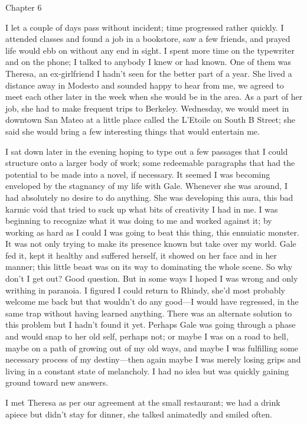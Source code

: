 Chapter 6

I let a couple of days pass without incident; time progressed rather
quickly. I attended classes and found a job in a bookstore, saw a few
friends, and prayed life would ebb on without any end in sight. I spent
more time on the typewriter and on the phone; I talked to anybody I knew
or had known. One of them was Theresa, an ex-girlfriend I hadn't seen
for the better part of a year. She lived a distance away in Modesto and
sounded happy to hear from me, we agreed to meet each other later in the
week when she would be in the area. As a part of her job, she had to
make frequent trips to Berkeley. Wednesday, we would meet in downtown
San Mateo at a little place called the L'Etoile on South B Street; she
said she would bring a few interesting things that would entertain me.

I sat down later in the evening hoping to type out a few passages that I
could structure onto a larger body of work; some redeemable paragraphs
that had the potential to be made into a novel, if necessary. It seemed
I was becoming enveloped by the stagnancy of my life with Gale. Whenever
she was around, I had absolutely no desire to do anything. She was
developing this aura, this bad karmic void that tried to suck up what
bits of creativity I had in me. I was beginning to recognize what it was
doing to me and worked against it; by working as hard as I could I was
going to beat this thing, this ennuiatic monster. It was not only trying
to make its presence known but take over my world. Gale fed it, kept it
healthy and suffered herself, it showed on her face and in her manner;
this little beast was on its way to dominating the whole scene. So why
don't I get out? Good question. But in some ways I hoped I was wrong and
only writhing in paranoia. I figured I could return to Rhindy, she'd
most probably welcome me back but that wouldn't do any good---I would
have regressed, in the same trap without having learned anything. There
was an alternate solution to this problem but I hadn't found it yet.
Perhaps Gale was going through a phase and would snap to her old self,
perhaps not; or maybe I was on a road to hell, maybe on a path of
growing out of my old ways, and maybe I was fulfilling some necessary
process of my destiny---then again maybe I was merely losing grips and
living in a constant state of melancholy. I had no idea but was quickly
gaining ground toward new answers.

I met Theresa as per our agreement at the small restaurant; we had a
drink apiece but didn't stay for dinner, she talked animatedly and
smiled often.

